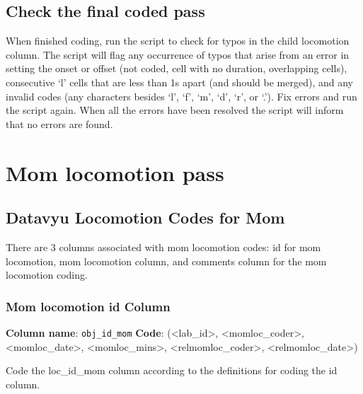 \documentclass[
  12pt,
]{book}
\begin{document}
\hypertarget{check-the-final-coded-pass-2}{%
\subsection*{Check the final coded pass}\label{check-the-final-coded-pass-2}}

When finished coding, run the script to check for typos in the child locomotion column. The script will flag any occurrence of typos that arise from an error in setting the onset or offset (not coded, cell with no duration, overlapping cells), consecutive `l' cells that are less than 1s apart (and should be merged), and any invalid codes (any characters besides `l', `f', `m', `d', `r', or `.'). Fix errors and run the script again. When all the errors have been resolved the script will inform that no errors are found.

\hypertarget{mom-locomotion-pass}{%
\section{Mom locomotion pass}\label{mom-locomotion-pass}}

\hypertarget{datavyu-locomotion-codes-for-mom}{%
\subsection*{Datavyu Locomotion Codes for Mom}\label{datavyu-locomotion-codes-for-mom}}

There are 3 columns associated with mom locomotion codes: id for mom locomotion, mom locomotion column, and comments column for the mom locomotion coding.

\hypertarget{mom-locomotion-id-column}{%
\subsubsection*{Mom locomotion id Column}\label{mom-locomotion-id-column}}

\textbf{Column name}: \texttt{obj\_id\_mom}
\textbf{Code}: (\textless lab\_id\textgreater, \textless momloc\_coder\textgreater, \textless momloc\_date\textgreater, \textless momloc\_mins\textgreater, \textless relmomloc\_coder\textgreater, \textless relmomloc\_date\textgreater)

Code the loc\_id\_mom column according to the definitions for coding the id column.
\end{document}
